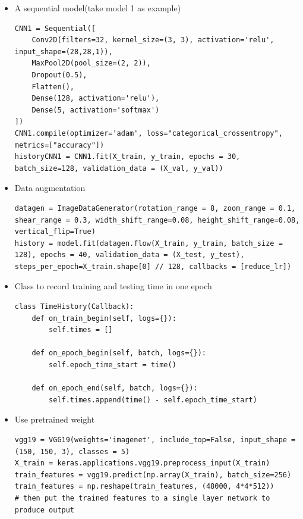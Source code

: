 \documentclass[12pt]{article}
\begin{document}
\begin{singlespacing}
\begin{itemize}
\item A sequential model(take model 1 as example)
\begin{verbatim}
CNN1 = Sequential([
    Conv2D(filters=32, kernel_size=(3, 3), activation='relu', input_shape=(28,28,1)),
    MaxPool2D(pool_size=(2, 2)),
    Dropout(0.5),
    Flatten(),
    Dense(128, activation='relu'),
    Dense(5, activation='softmax')
])
CNN1.compile(optimizer='adam', loss="categorical_crossentropy", metrics=["accuracy"])
historyCNN1 = CNN1.fit(X_train, y_train, epochs = 30, batch_size=128, validation_data = (X_val, y_val))
\end{verbatim}

\item Data augmentation
\begin{verbatim}
datagen = ImageDataGenerator(rotation_range = 8, zoom_range = 0.1, shear_range = 0.3, width_shift_range=0.08, height_shift_range=0.08, vertical_flip=True)
history = model.fit(datagen.flow(X_train, y_train, batch_size = 128), epochs = 40, validation_data = (X_test, y_test), steps_per_epoch=X_train.shape[0] // 128, callbacks = [reduce_lr])
\end{verbatim}

\item Class to record training and testing time in one epoch
\begin{verbatim}
class TimeHistory(Callback):
    def on_train_begin(self, logs={}):
        self.times = []

    def on_epoch_begin(self, batch, logs={}):
        self.epoch_time_start = time()

    def on_epoch_end(self, batch, logs={}):
        self.times.append(time() - self.epoch_time_start)
\end{verbatim}

\item Use pretrained weight
\begin{verbatim}
vgg19 = VGG19(weights='imagenet', include_top=False, input_shape = (150, 150, 3), classes = 5)
X_train = keras.applications.vgg19.preprocess_input(X_train)
train_features = vgg19.predict(np.array(X_train), batch_size=256)
train_features = np.reshape(train_features, (48000, 4*4*512))
# then put the trained features to a single layer network to produce output
\end{verbatim}


\end{itemize}
\end{singlespacing}
\end{document}
